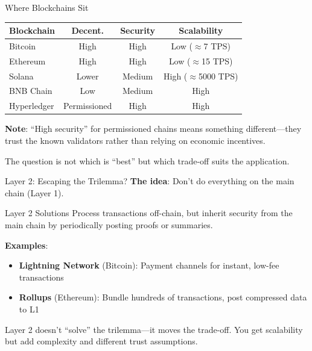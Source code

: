 \documentclass[10pt]{beamer}
\newcommand{\good}[1]{\textcolor{AccentGreen}{#1}}
\newcommand{\bad}[1]{\textcolor{AccentOrange}{#1}}
\begin{document}
\begin{frame}{Where Blockchains Sit}
  \begin{center}
  \begin{tabular}{lccc}
    \toprule
    \textbf{Blockchain} & \textbf{Decent.} & \textbf{Security} & \textbf{Scalability} \\
    \midrule
    Bitcoin & \good{High} & \good{High} & \bad{Low ($\approx$7 TPS)} \\
    Ethereum & \good{High} & \good{High} & \bad{Low ($\approx$15 TPS)} \\
    Solana & \bad{Lower} & Medium & \good{High ($\approx$5000 TPS)} \\
    BNB Chain & \bad{Low} & Medium & \good{High} \\
    Hyperledger & \bad{Permissioned} & \good{High} & \good{High} \\
    \bottomrule
  \end{tabular}
  \end{center}
  
  \vspace{1em}
  \textbf{Note}: ``High security'' for permissioned chains means something different---they trust the known validators rather than relying on economic incentives.
  
  \vspace{1em}
  The question is not which is ``best'' but which trade-off suits the application.
\end{frame}

\begin{frame}{Layer 2: Escaping the Trilemma?}
  \textbf{The idea}: Don't do everything on the main chain (Layer 1).
  
  \vspace{1em}
  \begin{block}{Layer 2 Solutions}
    Process transactions off-chain, but inherit security from the main chain by periodically posting proofs or summaries.
  \end{block}
  
  \vspace{0.5em}
  \textbf{Examples}:
  \begin{itemize}
    \item \textbf{Lightning Network} (Bitcoin): Payment channels for instant, low-fee transactions
    \item \textbf{Rollups} (Ethereum): Bundle hundreds of transactions, post compressed data to L1
  \end{itemize}
  
  \vspace{1em}
  Layer 2 doesn't ``solve'' the trilemma---it moves the trade-off. You get scalability but add complexity and different trust assumptions.
\end{frame}
\end{document}
